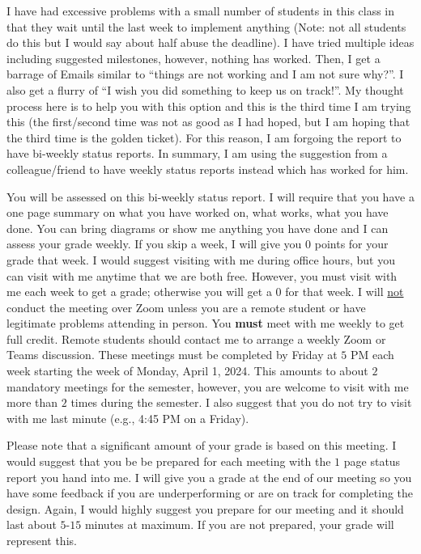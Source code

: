 \documentclass[times, 10pt, twocolumn]{IEEEtran}
\begin{document}
I have had excessive problems with a small number of students in this
class in that they wait until
the last week to implement anything (Note: not all students do this
but I would say about half abuse the deadline).  I have tried multiple ideas
including suggested milestones, however, nothing has worked.
Then, I get a barrage of Emails
similar to ``things are not working and I am not sure why?''.
I also get a flurry of ``I wish you did something to keep us on track!''.  My
thought process here is to help you with this option and this is the third
time I am trying this (the first/second time was not as good as I had hoped,
but I am hoping that the third time is the golden ticket).
For this reason, I am forgoing the report to have bi-weekly status reports.
In summary, I am
using the suggestion from a colleague/friend to have weekly status
reports instead which has worked for him.  

You will be assessed on this bi-weekly status report.
I will require that you have a
one page summary on what you have worked on, what works, what you have done.
You can bring diagrams or show me anything you have done and I can
assess your grade weekly.
If you skip a week, I will give you $0$ points for your grade that
week.  I would
suggest visiting with me during office hours, but you can visit with me
anytime that we are both free.  However, you must visit with
me each week to get a grade; otherwise you will get a $0$ for that
week.
I will \underline{not} conduct the meeting over 
Zoom unless you are a remote student
or have legitimate problems attending in person.
You \textbf{must} meet with me
weekly to get full credit.  Remote students
should contact me to arrange a weekly Zoom or Teams
discussion.  These meetings must be completed by Friday at $5$ PM each week
starting the week of Monday, April 1, 2024.  This amounts to about $2$
mandatory meetings for the semester, however, you are welcome to visit with me
more than $2$ times during the semester.  I also suggest that you do not
try to visit with me last minute (e.g., 4:45 PM on a Friday).

Please note that a significant amount of your grade is based on this
meeting.  I would suggest that you be be prepared
for each meeting with the $1$ page status report you hand into
me.  I will give you a grade at the end of our meeting
so you have some feedback if you are underperforming or are on track
for completing the design.  Again, I would highly suggest you prepare
for our meeting and it should last about $5$-$15$ minutes at maximum.
If you are not prepared, your grade will represent this.
\end{document}
